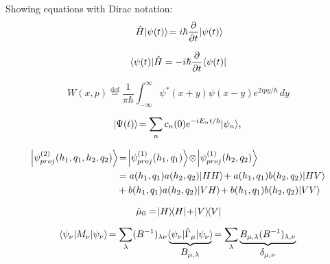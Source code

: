 Showing equations with Dirac notation:
\begin{equation}
  \label{eq:Dirac0-ket}
  {
    \displaystyle
    \hat{H}
    \!\left|\psi (t)\right\rangle\! =
    i \hbar
    \frac{\partial } {\partial t}
    \!\left|\psi (t)\right\rangle\!
  }
\end{equation}

\begin{equation}
  \label{eq:Dirac0-bra}
  {
    \displaystyle
    \!\left\langle\psi (t)\right|\!
    \hat{H} =
    -i \hbar
    \frac{\partial } {\partial t}
    \!\left\langle\psi (t)\right|\!
  }
\end{equation}

\begin{equation}
  \label{eq:Wigner}
  W(x,p) \stackrel{\mathrm{def}} {=}
  \frac{1} {\pi\hbar}
  \int_{-\infty}^\infty
  \psi^* (x+y) \psi (x-y) e^{2ipy/\hbar} \, dy
\end{equation}

\begin{equation}
  \!\left|\Psi(t)\right\rangle\! = \sum_{n} c_{n}(0) e^{-iE_{n}t/\hbar} \!\left|\psi_n\right\rangle\!,
\end{equation}

\begin{align}
    \ket{\psi_{proj}^{(2)}(h_1, q_1, h_2, q_2)}
    &= \ket{\psi_{proj}^{(1)}(h_1, q_1)} \otimes
    \ket {\psi_{proj}^{(1)}(h_2, q_2)} \nonumber\\
    &= a(h_1,q_1) a(h_2,q_2) \ket{HH}+
      a(h_1,q_1) b(h_2,q_2) \ket{HV} \nonumber\\
    &+ b(h_1,q_1) a(h_2,q_2) \ket{VH} +
      b(h_1,q_1) b(h_2,q_2) \ket{VV}
\end{align}

\begin{equation}
  \label{eq:Dirac1}
  \hat{\mu}_0 = \ketbra{H}{H} + \ketbra{V}{V}
\end{equation}

\begin{equation}
  \label{eq:Dirac2}
  \matrixel{\psi_\nu}{M_\nu}{\psi_\nu} = \sum_\lambda (B^{-1})_{\lambda \nu}
  \underbrace{
    \matrixel{\psi_\nu}{\hat\Gamma_\mu}{\psi_\nu}
  }_\text{ \normalsize{$B_{\mu, \lambda}$} } = 
  \sum_\lambda \underbrace{
    B_{\mu, \lambda} (B^{-1})_{\lambda, \nu}
  }_\text{\normalsize{$\delta_{\mu, \nu}$}}
\end{equation}

